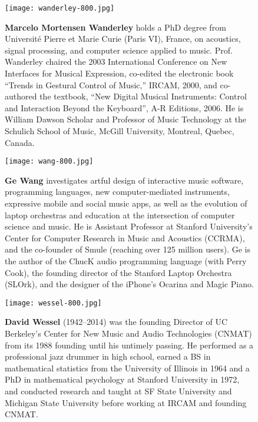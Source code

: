 \begin{authbio}
\begin{figure}[H]
  \sidecaption[t]
  \texttt{[image: wanderley-800.jpg]}
  \caption{\textbf{Marcelo Mortensen Wanderley} holds a PhD degree from Universit\'e Pierre et Marie Curie (Paris VI), France, on acoustics, signal processing, and computer science applied to music. Prof. Wanderley chaired the 2003 International Conference on New Interfaces for Musical Expression, co-edited the electronic book ``Trends in Gestural Control of Music,'' IRCAM, 2000, and co-authored the textbook, ``New Digital Musical Instruments: Control and Interaction Beyond the Keyboard'', A-R Editions, 2006. He is William Dawson Scholar and Professor of Music Technology at the Schulich School of Music, McGill University, Montreal, Quebec, Canada.}
\end{figure}

\begin{figure}[H]
  \sidecaption[t]
  \texttt{[image: wang-800.jpg]}
  \caption{\textbf{Ge Wang} investigates artful design of interactive music software, programming languages, new computer-mediated instruments, expressive mobile and social music apps, as well as the evolution of laptop orchestras and education at the intersection of computer science and music. He is Assistant Professor at Stanford University's Center for Computer Research in Music and Acoustics (CCRMA), and the co-founder of Smule (reaching over 125 million users). Ge is the author of the ChucK audio programming language (with Perry Cook), the founding director of the Stanford Laptop Orchestra (SLOrk), and the designer of the iPhone's Ocarina and Magic Piano.}
\end{figure}

\begin{figure}[H]
  \sidecaption[t]
  \texttt{[image: wessel-800.jpg]}
  \caption{\textbf{David Wessel} (1942--2014) was the founding Director of UC Berkeley's Center for New Music and Audio Technologies (CNMAT) from its 1988 founding until his untimely passing. He performed as a professional jazz drummer in high school, earned a BS in mathematical statistics from the University of Illinois in 1964 and a PhD in mathematical psychology at Stanford University in 1972, and conducted research and taught at SF State University and Michigan State University before working at IRCAM and founding CNMAT.}
\end{figure}


\end{authbio}
